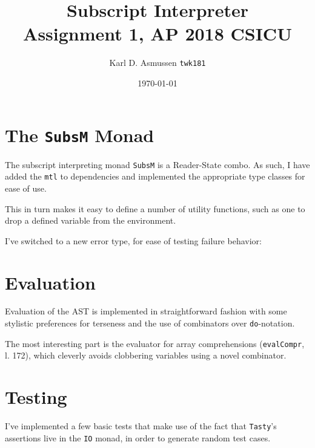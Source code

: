 \documentclass[a4paper,article,10pt,notitlepage,onecolumn,oneside]{memoir}
\date{\protect\today}
\title{Subscript Interpreter \\ Assignment 1, AP 2018 CSICU}
\author{Karl D. Asmussen \texttt{twk181}}
\begin{document}
\mainmatter

\maketitle

\section{The \lstinline{SubsM} Monad}

\newcommand\thecodefile{SubsInterpreter.hs}
\newcommand\thecodedir{handin/src/}
\newcommand\showlines[2]{%
%
}

The subscript interpreting monad \lstinline{SubsM} is a Reader-State combo.
As such, I have added the \verb+mtl+ to dependencies and implemented the appropriate
type classes for ease of use.

\showlines{93}{106}

This in turn makes it easy to define a number of utility functions, such as one
to drop a defined variable from the environment.

I've switched to a new error type, for ease of testing failure behavior:

\showlines{56}{68}

\section{Evaluation}

Evaluation of the AST is implemented in straightforward fashion with some
stylistic preferences for terseness and the use of combinators over \lstinline{do}-notation.

\showlines{157}{158}
\showlines{163}{164}

The most interesting part is the evaluator for array comprehensions (\lstinline{evalCompr}, l. 172),
which cleverly avoids clobbering variables using a novel combinator.

\showlines{308}{310}

\section{Testing}

I've implemented a few basic tests that make use of the fact that \lstinline{Tasty}'s assertions
live in the \lstinline{IO} monad, in order to generate random test cases.
\end{document}
